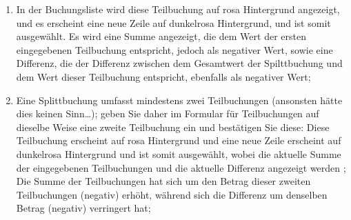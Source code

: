 \begin{enumerate}
	\item In der Buchungsliste wird diese Teilbuchung auf {\setlength{\fboxsep}{2pt}\colorbox[RGB]{240,200,200}{rosa Hintergrund}} angezeigt, und es erscheint eine neue Zeile auf {\setlength{\fboxsep}{2pt}\colorbox[RGB]{245,155,155}{dunkelrosa Hintergrund}}, und ist somit ausgewählt. Es wird eine Summe angezeigt, die dem Wert der ersten eingegebenen Teilbuchung entspricht, jedoch als negativer Wert, sowie eine Differenz, die der Differenz zwischen dem Gesamtwert der Spilttbuchung und dem Wert dieser Teilbuchung entspricht, ebenfalls als negativer Wert;
	\item Eine Splittbuchung umfasst mindestens zwei Teilbuchungen (ansonsten hätte dies keinen Sinn\ldots); geben Sie daher im Formular für Teilbuchungen auf dieselbe Weise eine zweite Teilbuchung ein und bestätigen Sie diese: Diese Teilbuchung erscheint auf {\setlength{\fboxsep}{2pt}\colorbox[RGB]{240,200,200}{rosa Hintergrund}} und eine neue Zeile erscheint auf {\setlength{\fboxsep}{2pt}\colorbox[RGB]{245,155,155}{dunkelrosa Hintergrund}} und ist somit ausgewählt, wobei die aktuelle Summe der eingegebenen Teilbuchungen und die aktuelle Differenz angezeigt werden ;
	Die Summe der Teilbuchungen hat sich um den Betrag dieser zweiten Teilbuchungen (negativ) erhöht, während sich die Differenz um denselben Betrag (negativ) verringert hat;

\end{enumerate}
